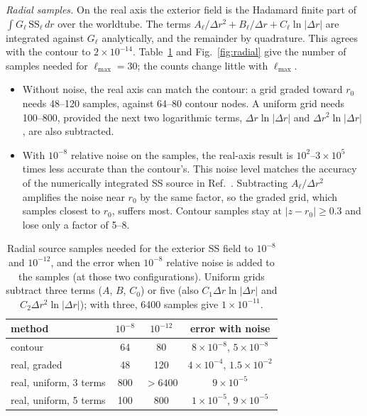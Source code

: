 \documentclass[aps,prd,twocolumn,superscriptaddress,nofootinbib,floatfix]{revtex4-2}
\begin{document}
\emph{Radial samples.}
On the real axis the exterior field is the Hadamard finite part of $\int G_\ell\,\mathrm{SS}_\ell\,dr$ over the worldtube.
The terms $A_\ell/\Delta r^2+B_\ell/\Delta r+C_\ell\ln|\Delta r|$ are integrated against $G_\ell$ analytically, and the remainder by quadrature.
This agrees with the contour to $2\times10^{-14}$.
Table~\ref{tab:radial} and Fig.~\ref{fig:radial} give the number of samples needed for $\ell_{\max}=30$; the counts change little with $\ell_{\max}$.
\begin{itemize}
\item Without noise, the real axis can match the contour: a grid graded toward $r_0$ needs 48--120 samples, against 64--80 contour nodes.
A uniform grid needs 100--800, provided the next two logarithmic terms, $\Delta r\ln|\Delta r|$ and $\Delta r^2\ln|\Delta r|$, are also subtracted.
\item With $10^{-8}$ relative noise on the samples, the real-axis result is $10^2$--$3\times10^5$ times less accurate than the contour's.
This noise level matches the accuracy of the numerically integrated SS source in Ref.~\cite{Upton2026}.
Subtracting $A_\ell/\Delta r^2$ amplifies the noise near $r_0$ by the same factor, so the graded grid, which samples closest to $r_0$, suffers most.
Contour samples stay at $|z-r_0|\ge0.3$ and lose only a factor of 5--8.
\end{itemize}

\begin{table}[t]
\caption{Radial source samples needed for the exterior SS field to $10^{-8}$ and $10^{-12}$, and the error when $10^{-8}$ relative noise is added to the samples (at those two configurations).
Uniform grids subtract three terms ($A$, $B$, $C_0$) or five (also $C_1\Delta r\ln|\Delta r|$ and $C_2\Delta r^2\ln|\Delta r|$); with three, 6400 samples give $1\times10^{-11}$.}
\label{tab:radial}
\begin{ruledtabular}
\begin{tabular}{lccc}
method & $10^{-8}$ & $10^{-12}$ & error with noise\\
\hline
contour & 64 & 80 & $8\times10^{-8}$, $5\times10^{-8}$\\
real, graded & 48 & 120 & $4\times10^{-4}$, $1.5\times10^{-2}$\\
real, uniform, 3 terms & 800 & $>6400$ & $9\times10^{-5}$\\
real, uniform, 5 terms & 100 & 800 & $1\times10^{-5}$, $9\times10^{-5}$\\
\end{tabular}
\end{ruledtabular}
\end{table}
\end{document}
